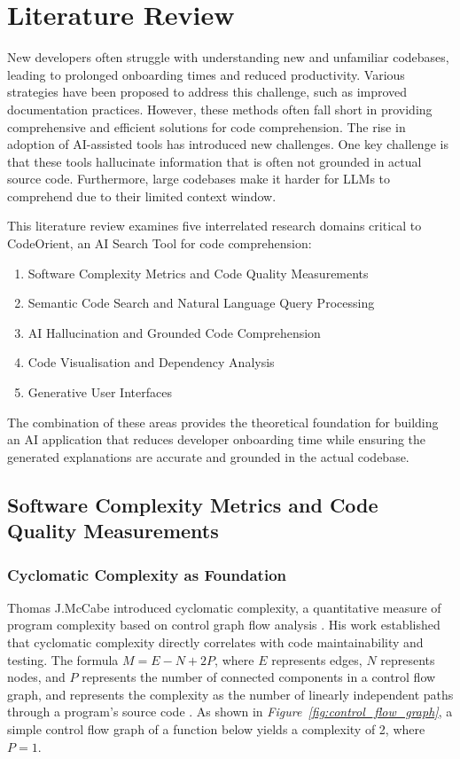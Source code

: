 \chapter{Literature Review}

New developers often struggle with understanding new and unfamiliar codebases, leading to prolonged onboarding times and reduced productivity. Various strategies have been proposed to address this challenge, such as improved documentation practices. However, these methods often fall short in providing comprehensive and efficient solutions for code comprehension. The rise in adoption of AI-assisted tools has introduced new challenges. One key challenge is that these tools hallucinate information that is often not grounded in actual source code. Furthermore, large codebases make it harder for LLMs to comprehend due to their limited context window.

This literature review examines five interrelated research domains critical to CodeOrient, an AI Search Tool for code comprehension:

\begin{enumerate}
    \item Software Complexity Metrics and Code Quality Measurements
    \item Semantic Code Search and Natural Language Query Processing
    \item AI Hallucination and Grounded Code Comprehension
    \item Code Visualisation and Dependency Analysis
    \item Generative User Interfaces
\end{enumerate}
The combination of these areas provides the theoretical foundation for building an AI application that reduces developer onboarding time while ensuring the generated explanations are accurate and grounded in the actual codebase.

\section{Software Complexity Metrics and Code Quality Measurements}

\subsection{Cyclomatic Complexity as Foundation}
Thomas J.McCabe introduced cyclomatic complexity, a quantitative measure of program complexity based on control graph flow analysis \cite{mccabe1976}. His work established that cyclomatic complexity directly correlates with code maintainability and testing. The formula $M=E-N+2P$, where $E$ represents edges, $N$ represents nodes, and $P$ represents the number of connected components in a control flow graph, and represents the complexity as the number of linearly independent paths through a program’s source code \cite{mccabe1976}. As shown in \textit{Figure~\ref{fig:control_flow_graph}}, a simple control flow graph of a function below yields a complexity of 2, where $P=1$.

